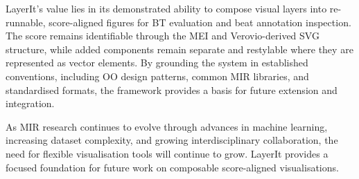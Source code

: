 LayerIt's value lies in its demonstrated ability to compose visual layers into re-runnable, score-aligned figures for BT evaluation and beat annotation inspection. The score remains identifiable through the MEI and Verovio-derived SVG structure, while added components remain separate and restylable where they are represented as vector elements. By grounding the system in established conventions, including OO design patterns, common MIR libraries, and standardised formats, the framework provides a basis for future extension and integration.

As MIR research continues to evolve through advances in machine learning, increasing dataset complexity, and growing interdisciplinary collaboration, the need for flexible visualisation tools will continue to grow. LayerIt provides a focused foundation for future work on composable score-aligned visualisations.
